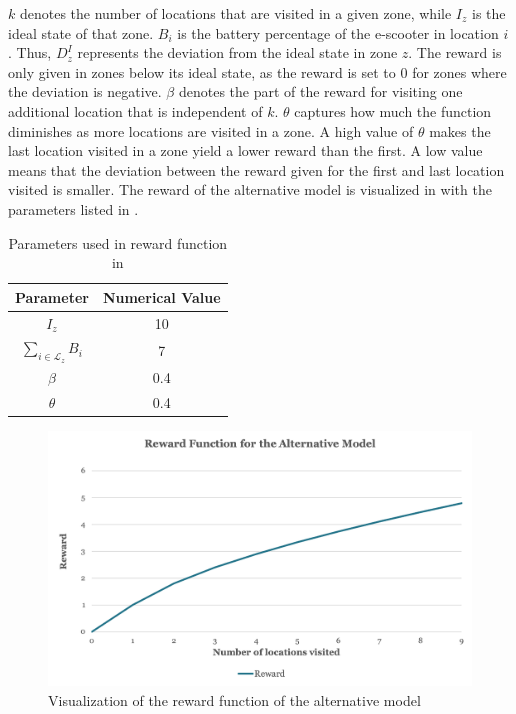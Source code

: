 $k$ denotes the number of locations that are visited in a given zone, while $I_z$ is the ideal state of that zone. $B_i$ is the battery percentage of the e-scooter in location $i$. Thus, $D^I_z$ represents the deviation from the ideal state in zone $z$. The reward is only given in zones below its ideal state, as the reward is set to 0 for zones where the deviation is negative. $\beta$ denotes the part of the reward for visiting one additional location that is independent of $k$. $\theta$ captures how much the function diminishes as more locations are visited in a zone. A high value of $\theta$ makes the last location visited in a zone yield a lower reward than the first. A low value means that the deviation between the reward given for the first and last location visited is smaller. The reward of the alternative model is visualized in  with the parameters listed in .
\\
\begingroup
    \setlength{\tabcolsep}{10pt} %
    \renewcommand{\arraystretch}{1.9} %
    \begin{table}[h]
        \centering
        \caption{Parameters used in reward function in }
        \begin{tabular}{c|c}
            
             \textbf{Parameter} & \textbf{Numerical Value}   \\
             \hline
             $I_z$ & 10\\
             \hline
             $\sum_{i\in \mathcal{L}_z} B_i$ & 7\\
             \hline
             $\beta$ & 0.4\\
             \hline
             $\theta$ & 0.4 \\
             
        \end{tabular}
        \label{tab:param_reward_function}
    \end{table}
\endgroup

\begin{figure}[H]
    \centering
    \includegraphics[width=0.8\columnwidth]{Images/alt_reward.png}
    \caption{Visualization of the reward function of the alternative model}
    \label{fig:alt_reward_function}
\end{figure}

